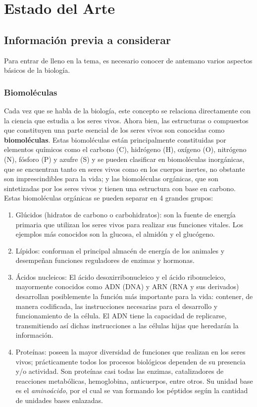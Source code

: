 \chapter{Estado del Arte}

\section{Información previa a considerar}

Para entrar de lleno en la tema, es necesario conocer de antemano varios aspectos básicos de la biología.

\subsection{Biomoléculas}

Cada vez que se habla de la biología, este concepto se relaciona directamente con la ciencia que estudia a los seres vivos. Ahora bien, las estructuras o compuestos que constituyen una parte esencial de los seres vivos son conocidas como \textbf{biomoléculas}. Estas biomoléculas están principalmente constituidas por elementos químicos como el carbono (C), hidrógeno (H), oxígeno (O), nitrógeno (N), fósforo (P) y azufre (S) \cite{biomolecula} y se pueden clasificar en biomoléculas inorgánicas, que se encuentran tanto en seres vivos como en los cuerpos inertes, no obstante son imprescindibles para la vida; y las biomoléculas orgánicas, que son sintetizadas por los seres vivos y tienen una estructura con base en carbono. Estas biomoléculas orgánicas se pueden separar en 4 grandes grupos:
\begin{enumerate}
\item Glúcidos (hidratos de carbono o carbohidratos): son la fuente de energía primaria que utilizan los seres vivos para realizar sus funciones vitales. Los ejemplos más conocidos son la glucosa, el almidón y el glucógeno.
\item Lípidos: conforman el principal almacén de energía de los animales y desempeñan funciones reguladores de enzimas y hormonas.
\item Ácidos nucleicos: El ácido desoxirribonucleico y el ácido ribonucleico, mayormente conocidos como ADN (DNA) y ARN (RNA y sus derivados) desarrollan posiblemente la función más importante para la vida: contener, de manera codificada, las instrucciones necesarias para el desarrollo y funcionamiento de la célula. El ADN tiene la capacidad de replicarse, transmitiendo así dichas instrucciones a las células hijas que heredarán la información.
\item Proteínas: poseen la mayor diversidad de funciones que realizan en los seres vivos; prácticamente todos los procesos biológicos dependen de su presencia y/o actividad. Son proteínas casi todas las enzimas, catalizadores de reacciones metabólicas, hemoglobina, anticuerpos, entre otros. Su unidad base es el {\it{aminoácido}}, por el cual se van formando los péptidos según la cantidad de unidades bases enlazadas.
\end{enumerate}

